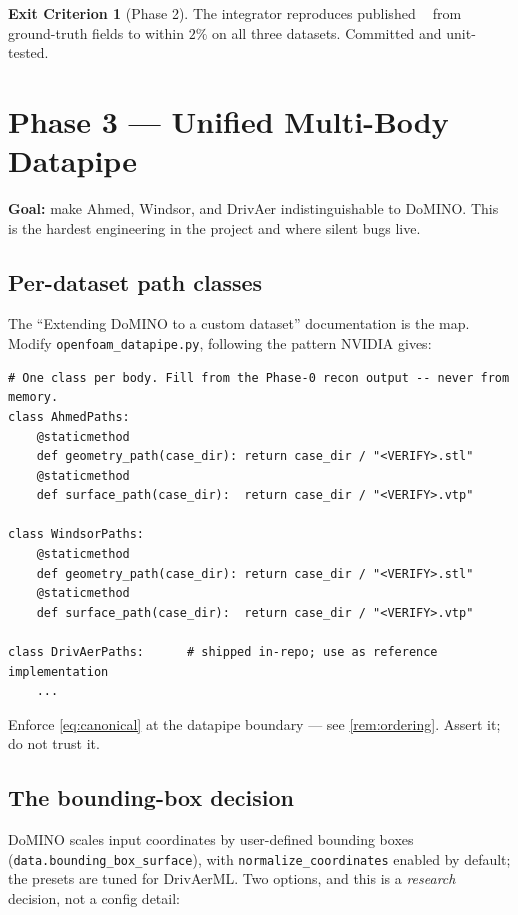 \documentclass[10pt,a4paper]{article}
\theoremstyle{definition}
\newtheorem{criterion}{Exit Criterion}[section]
\DeclareMathOperator{\Cd}{C_d}
\begin{document}
\begin{criterion}[Phase 2]
\label{crit:p2}
The integrator reproduces published $\Cd$ from ground-truth fields to within $2\%$
on all three datasets. Committed and unit-tested.
\end{criterion}

\section{Phase 3 --- Unified Multi-Body Datapipe}
\label{sec:phase3}

\textbf{Goal:} make Ahmed, Windsor, and DrivAer indistinguishable to DoMINO. This
is the hardest engineering in the project and where silent bugs live.

\subsection{Per-dataset path classes}

The ``Extending DoMINO to a custom dataset'' documentation is the map. Modify
\texttt{openfoam\_datapipe.py}, following the pattern NVIDIA gives:

\begin{lstlisting}
# One class per body. Fill from the Phase-0 recon output -- never from memory.
class AhmedPaths:
    @staticmethod
    def geometry_path(case_dir): return case_dir / "<VERIFY>.stl"
    @staticmethod
    def surface_path(case_dir):  return case_dir / "<VERIFY>.vtp"

class WindsorPaths:
    @staticmethod
    def geometry_path(case_dir): return case_dir / "<VERIFY>.stl"
    @staticmethod
    def surface_path(case_dir):  return case_dir / "<VERIFY>.vtp"

class DrivAerPaths:      # shipped in-repo; use as reference implementation
    ...
\end{lstlisting}

Enforce \cref{eq:canonical} at the datapipe boundary --- see \cref{rem:ordering}.
Assert it; do not trust it.

\subsection{The bounding-box decision}

DoMINO scales input coordinates by user-defined bounding boxes
(\texttt{data.bounding\_box\_surface}), with \texttt{normalize\_coordinates}
enabled by default; the presets are tuned for DrivAerML. Two options, and this is
a \emph{research} decision, not a config detail:
\end{document}
